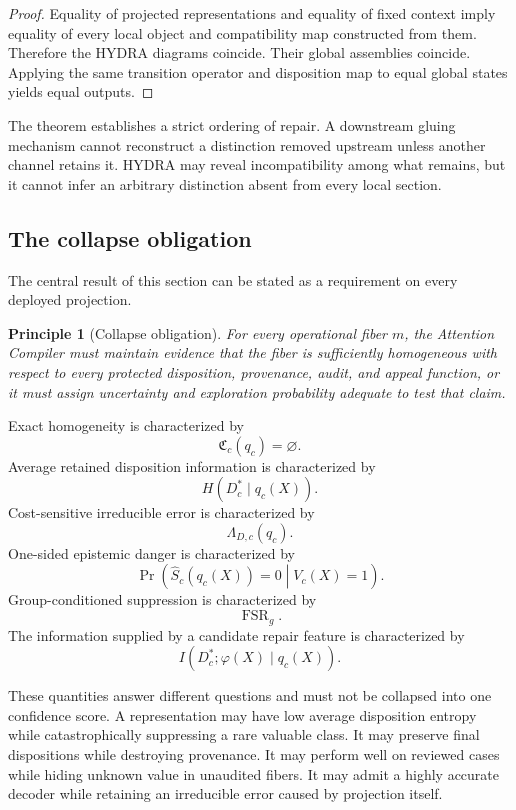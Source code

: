 \documentclass[11pt]{article}
\newtheorem{principle}[definition]{Principle}
\theoremstyle{definition}
\DeclareMathOperator{\Prob}{Pr}
\begin{document}
\begin{proof}
Equality of projected representations and equality of fixed context imply equality of every local object and compatibility map constructed from them. Therefore the HYDRA diagrams coincide. Their global assemblies coincide. Applying the same transition operator and disposition map to equal global states yields equal outputs.
\end{proof}

The theorem establishes a strict ordering of repair. A downstream gluing mechanism cannot reconstruct a distinction removed upstream unless another channel retains it. HYDRA may reveal incompatibility among what remains, but it cannot infer an arbitrary distinction absent from every local section.

\subsection{The collapse obligation}

The central result of this section can be stated as a requirement on every deployed projection.

\begin{principle}[Collapse obligation]
For every operational fiber \(m\), the Attention Compiler must maintain evidence that the fiber is sufficiently homogeneous with respect to every protected disposition, provenance, audit, and appeal function, or it must assign uncertainty and exploration probability adequate to test that claim.
\end{principle}

Exact homogeneity is characterized by
\[
\mathfrak C_c(q_c)=\varnothing.
\]
Average retained disposition information is characterized by
\[
H(D_c^{*}\mid q_c(X)).
\]
Cost-sensitive irreducible error is characterized by
\[
\Lambda_{D,c}(q_c).
\]
One-sided epistemic danger is characterized by
\[
\Prob
\left(
\widehat S_c(q_c(X))=0
\middle|
V_c(X)=1
\right).
\]
Group-conditioned suppression is characterized by
\[
\operatorname{FSR}_g.
\]
The information supplied by a candidate repair feature is characterized by
\[
I(D_c^{*};\varphi(X)\mid q_c(X)).
\]

These quantities answer different questions and must not be collapsed into one confidence score. A representation may have low average disposition entropy while catastrophically suppressing a rare valuable class. It may preserve final dispositions while destroying provenance. It may perform well on reviewed cases while hiding unknown value in unaudited fibers. It may admit a highly accurate decoder while retaining an irreducible error caused by projection itself.
\end{document}
